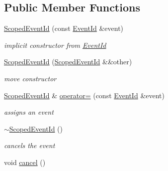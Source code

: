 \subsection*{Public Member Functions}
\begin{DoxyCompactItemize}
\item 
\hyperlink{classnfd_1_1scheduler_1_1ScopedEventId_ad58a88b389afaf056f38f03f4c9f32ed}{Scoped\+Event\+Id} (const \hyperlink{classEventId}{Event\+Id} \&event)
\begin{DoxyCompactList}\small\item\em implicit constructor from \hyperlink{classEventId}{Event\+Id} \end{DoxyCompactList}\item 
\hyperlink{classnfd_1_1scheduler_1_1ScopedEventId_a40e0a86eb5b5a44bae7473c78a3bb9e2}{Scoped\+Event\+Id} (\hyperlink{classnfd_1_1scheduler_1_1ScopedEventId}{Scoped\+Event\+Id} \&\&other)\hypertarget{classnfd_1_1scheduler_1_1ScopedEventId_a40e0a86eb5b5a44bae7473c78a3bb9e2}{}\label{classnfd_1_1scheduler_1_1ScopedEventId_a40e0a86eb5b5a44bae7473c78a3bb9e2}

\begin{DoxyCompactList}\small\item\em move constructor \end{DoxyCompactList}\item 
\hyperlink{classnfd_1_1scheduler_1_1ScopedEventId}{Scoped\+Event\+Id} \& \hyperlink{classnfd_1_1scheduler_1_1ScopedEventId_a2c2902f716b06a6de49a15ae8874c37a}{operator=} (const \hyperlink{classEventId}{Event\+Id} \&event)
\begin{DoxyCompactList}\small\item\em assigns an event \end{DoxyCompactList}\item 
\hyperlink{classnfd_1_1scheduler_1_1ScopedEventId_a49f0a342b376a03a93e083bd4437c763}{$\sim$\+Scoped\+Event\+Id} ()\hypertarget{classnfd_1_1scheduler_1_1ScopedEventId_a49f0a342b376a03a93e083bd4437c763}{}\label{classnfd_1_1scheduler_1_1ScopedEventId_a49f0a342b376a03a93e083bd4437c763}

\begin{DoxyCompactList}\small\item\em cancels the event \end{DoxyCompactList}\item 
void \hyperlink{classnfd_1_1scheduler_1_1ScopedEventId_a2c11997d2dc25570912754fcc66483eb}{cancel} ()\hypertarget{classnfd_1_1scheduler_1_1ScopedEventId_a2c11997d2dc25570912754fcc66483eb}{}\label{classnfd_1_1scheduler_1_1ScopedEventId_a2c11997d2dc25570912754fcc66483eb}


\end{DoxyCompactItemize}

